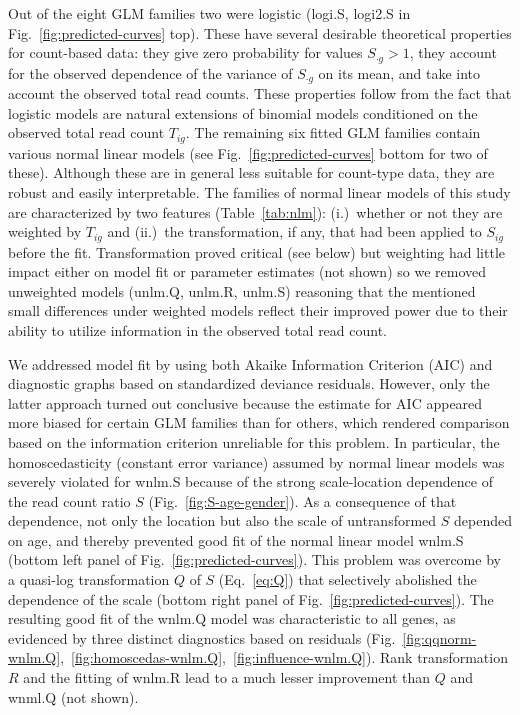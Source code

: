 \documentclass[letterpaper]{article}
\begin{document}
Out of the eight GLM families two were logistic (logi.S, logi2.S in
Fig.~\ref{fig:predicted-curves} top).  These have several desirable
theoretical properties for count-based data: they give zero probability for
values \(S_{\cdot g}>1\), they account for the observed dependence of the
variance of \(S_{\cdot g}\) on its mean, and take into account the observed
total read counts.  These properties follow from the fact that logistic models
are natural extensions of binomial models conditioned on the observed total
read count \(T_{ig}\).  The remaining six fitted GLM families contain various
normal linear models (see Fig.~\ref{fig:predicted-curves} bottom for two of
these).  Although these are in general less suitable for count-type data, they
are robust and easily interpretable. The families of normal linear models of
this study are characterized by two features (Table~\ref{tab:nlm}):
(i.)~whether or not they are weighted by \(T_{ig}\) and (ii.)~the
transformation, if any, that had been applied to \(S_{ig}\) before the fit.
Transformation proved critical (see below) but weighting had little impact
either on model fit or parameter estimates (not shown) so we removed
unweighted models (unlm.Q, unlm.R, unlm.S) reasoning that the mentioned small
differences under weighted models reflect their improved power due to their
ability to utilize information in the observed total read count.

We addressed model fit by using both Akaike Information Criterion (AIC) and
diagnostic graphs based on standardized deviance residuals.  However, only the
latter approach turned out conclusive because the estimate for AIC appeared
more biased for certain GLM families than for others, which rendered
comparison based on the information criterion unreliable for this problem.  In
particular, the homoscedasticity (constant error variance) assumed by normal
linear models was severely violated for wnlm.S because of the strong
scale-location dependence of the read count ratio \(S\)
(Fig.~\ref{fig:S-age-gender}).  As a consequence of that dependence, not only
the location but also the scale of untransformed \(S\) depended on age, and
thereby prevented good fit of the normal linear model wnlm.S (bottom left
panel of Fig.~\ref{fig:predicted-curves}).  This problem was overcome by a
quasi-log transformation \(Q\) of \(S\) (Eq.~\ref{eq:Q}) that selectively abolished
the dependence of the scale (bottom right panel of
Fig.~\ref{fig:predicted-curves}).  The resulting good fit of the wnlm.Q model
was characteristic to all genes, as evidenced by three distinct
diagnostics based on residuals
(Fig.~\ref{fig:qqnorm-wnlm.Q},~\ref{fig:homoscedas-wnlm.Q},~\ref{fig:influence-wnlm.Q}).
Rank transformation \(R\) and the fitting of wnlm.R lead to a much lesser
improvement than \(Q\) and wnml.Q (not shown).
\end{document}
